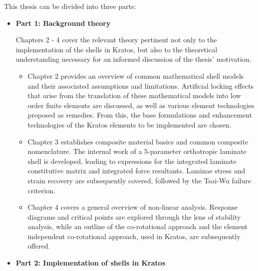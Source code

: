 This thesis can be divided into three parts:
\begin{itemize}
	\item \textbf{Part 1: Background theory}
	
	Chapters 2 - 4 cover the relevant theory pertinent not only to the implementation of the shells in Kratos, but also to the theoretical understanding necessary for an informed discussion of the thesis' motivation.
	\begin{itemize}
		\item Chapter 2 provides an overview of common mathematical shell models and their associated assumptions and limitations. Artificial locking effects that arise from the translation of these mathematical models into low order finite elements are discussed, as well as various element technologies proposed as remedies. From this, the base formulations and enhancement technologies of the Kratos elements to be implemented are chosen.
		\item Chapter 3 establishes composite material basics and common composite nomenclature. The internal work of a 5-parameter orthotropic laminate shell is developed, leading to expressions for the integrated laminate constitutive matrix and integrated force resultants. Laminae stress and strain recovery are subsequently covered, followed by the Tsai-Wu failure criterion.
		\item Chapter 4 covers a general overview of non-linear analysis. Response diagrams and critical points are explored through the lens of stability analysis, while an outline of the co-rotational approach and the element independent co-rotational approach, used in Kratos, are subsequently offered.
	\end{itemize}


	\item \textbf{Part 2: Implementation of shells in Kratos}
	

\end{itemize}
